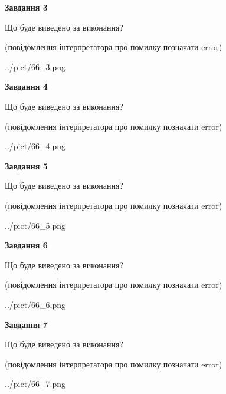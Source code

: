 \documentclass[12pt, ukrainian]{article}
\begin{document}
{\begin {large}
{\begin {center}\textbf{Завдання 3}\end {center}}\par
Що буде виведено за виконання?\par
 (повідомлення інтерпретатора про помилку позначати error)\par
\begin{center}
	{../pict/66_3.png}
\end{center}
\newpage

{\begin {center}\textbf{Завдання 4}\end {center}}\par
Що буде виведено за виконання?\par
 (повідомлення інтерпретатора про помилку позначати error)\par
\begin{center}
	{../pict/66_4.png}
\end{center}
\newpage

{\begin {center}\textbf{Завдання 5}\end {center}}\par
Що буде виведено за виконання?\par
 (повідомлення інтерпретатора про помилку позначати error)\par
\begin{center}
	{../pict/66_5.png}
\end{center}
\newpage

{\begin {center}\textbf{Завдання 6}\end {center}}\par
Що буде виведено за виконання?\par
 (повідомлення інтерпретатора про помилку позначати error)\par
\begin{center}
	{../pict/66_6.png}
\end{center}
\newpage

{\begin {center}\textbf{Завдання 7}\end {center}}\par
Що буде виведено за виконання?\par
 (повідомлення інтерпретатора про помилку позначати error)\par
\begin{center}
	{../pict/66_7.png}
\end{center}
\newpage


\end{large}}
\end{document}
